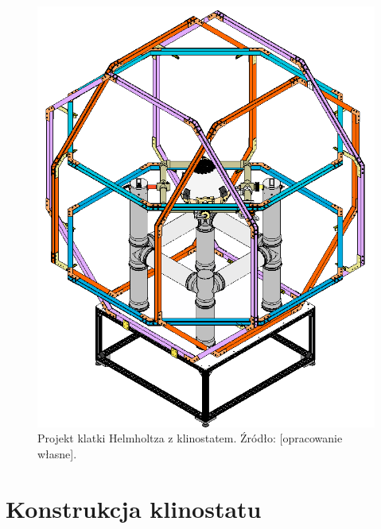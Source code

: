 \begin{figure}
	\centering
	\includegraphics[scale=0.3]{klinostat_klatka}
	\caption{Projekt klatki Helmholtza z klinostatem. Źródło: [opracowanie własne].} 
	\label{fig:klatka_helmholtza}
\end{figure}

\section{Konstrukcja klinostatu} \label{konstrukcja}

